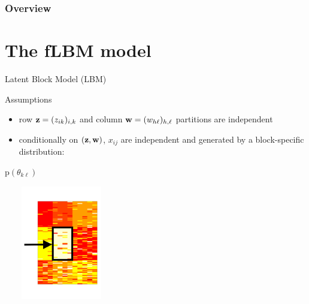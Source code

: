 \documentclass[10pt]{beamer}
\newcommand{\pdf}{\mbox{p}}
\newcommand{\bz}{\bold{z}}
\newcommand{\bw}{\bold{w}}
\begin{document}
\begin{frame}
\frametitle{Overview} 
\tableofcontents
\end{frame}

\section{The fLBM model}

\begin{frame}{Latent Block Model (LBM)}
\begin{block}{Assumptions}
\begin{itemize}
\item row $\bz=(z_{ik})_{i,k}$ and column $\bw=(w_{h\ell})_{h,\ell}$ partitions are independent
\item conditionally on $(\bz,\bw)$, $x_{ij}$ are independent and generated by a block-specific distribution:
\end{itemize}
\begin{minipage}[c]{.36\linewidth}
\hfill$\pdf{(\theta_{k\ell})}$
   \end{minipage}
   \begin{minipage}[c]{.46\linewidth}
\includegraphics[height=5cm,width=5cm,angle=0]{images/LBM2.pdf}
   \end{minipage}
\end{block}
\end{frame}
\end{document}
